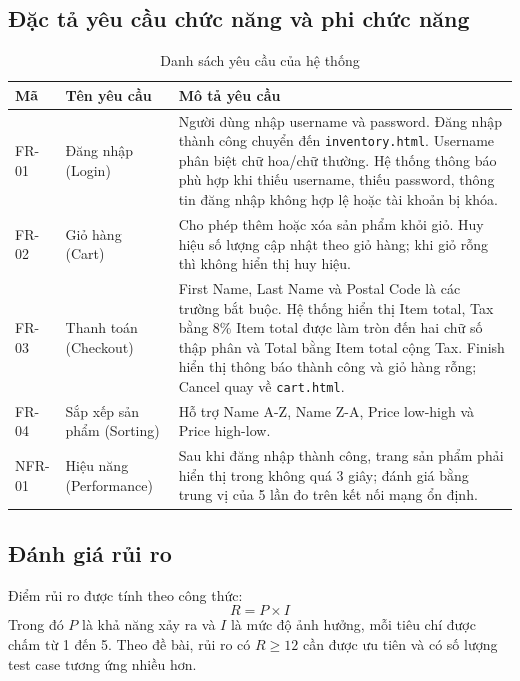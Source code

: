 \documentclass[a4paper,12pt]{article}
\begin{document}
\subsection{Đặc tả yêu cầu chức năng và phi chức năng}
\begin{table}[htbp]
\centering
\caption{Danh sách yêu cầu của hệ thống}
\small
\begin{tabularx}{\textwidth}{|p{1.8cm}|p{2.7cm}|X|}
\hline
\textbf{Mã} & \textbf{Tên yêu cầu} & \textbf{Mô tả yêu cầu} \\
\hline
FR-01 & Đăng nhập (Login) & Người dùng nhập username và password. Đăng nhập thành công chuyển đến \texttt{inventory.html}. Username phân biệt chữ hoa/chữ thường. Hệ thống thông báo phù hợp khi thiếu username, thiếu password, thông tin đăng nhập không hợp lệ hoặc tài khoản bị khóa. \\
\hline
FR-02 & Giỏ hàng (Cart) & Cho phép thêm hoặc xóa sản phẩm khỏi giỏ. Huy hiệu số lượng cập nhật theo giỏ hàng; khi giỏ rỗng thì không hiển thị huy hiệu. \\
\hline
FR-03 & Thanh toán (Checkout) & First Name, Last Name và Postal Code là các trường bắt buộc. Hệ thống hiển thị Item total, Tax bằng 8\% Item total được làm tròn đến hai chữ số thập phân và Total bằng Item total cộng Tax. Finish hiển thị thông báo thành công và giỏ hàng rỗng; Cancel quay về \texttt{cart.html}. \\
\hline
FR-04 & Sắp xếp sản phẩm (Sorting) & Hỗ trợ Name A-Z, Name Z-A, Price low-high và Price high-low. \\
\hline
NFR-01 & Hiệu năng (Performance) & Sau khi đăng nhập thành công, trang sản phẩm phải hiển thị trong không quá 3 giây; đánh giá bằng trung vị của 5 lần đo trên kết nối mạng ổn định. \\
\hline
\end{tabularx}
\end{table}

\subsection{Đánh giá rủi ro}
Điểm rủi ro được tính theo công thức:
\[
R = P \times I
\]
Trong đó $P$ là khả năng xảy ra và $I$ là mức độ ảnh hưởng, mỗi tiêu chí được chấm từ 1 đến 5. Theo đề bài, rủi ro có $R \geq 12$ cần được ưu tiên và có số lượng test case tương ứng nhiều hơn.
\end{document}
